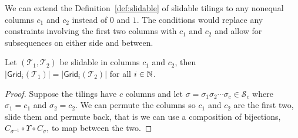 We can extend the Definition~\ref{def:slidable} of slidable tilings to any nonequal columns $c_1$ and $c_2$ instead of $0$ and $1$. The conditions would replace any constraints involving the first two columns with $c_1$ and $c_2$ and allow for subsequences on either side and between.

\begin{proposition}
Let $(\mathcal{T}_1,\mathcal{T}_2)$ be slidable in columns $c_1$ and $c_2$, then $|\textsf{Grid}_i(\mathcal{T}_1)| = |\textsf{Grid}_i(\mathcal{T}_2)|$ for all $i\in\mathbb{N}$.
\end{proposition}
\begin{proof}
Suppose the tilings have $c$ columns and let $\sigma = \sigma_1\sigma_2 \cdots \sigma_c \in \mathcal{S}_c$ where $\sigma_1 = c_1$ and $\sigma_2 = c_2$. We can permute the columns so $c_1$ and $c_2$ are the first two, slide them and permute back, that is we can use a composition of bijections, $C_{\sigma^{-1}} \circ \Upsilon \circ C_\sigma$, to map between the two.
\end{proof}